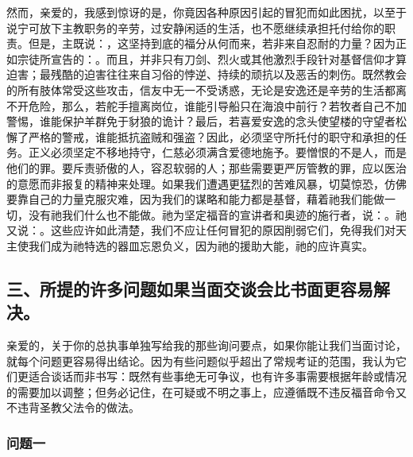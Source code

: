 然而，亲爱的，我感到惊讶的是，你竟因各种原因引起的冒犯而如此困扰，以至于说宁可放下主教职务的辛劳，过安静闲适的生活，也不愿继续承担托付给你的职责。但是，主既说：，这坚持到底的福分从何而来，若非来自忍耐的力量？因为正如宗徒所宣告的：。而且，并非只有刀剑、烈火或其他激烈手段针对基督信仰才算迫害；最残酷的迫害往往来自习俗的悖逆、持续的顽抗以及恶舌的刺伤。既然教会的所有肢体常受这些攻击，信友中无一不受诱惑，无论是安逸还是辛劳的生活都离不开危险，那么，若舵手擅离岗位，谁能引导船只在海浪中前行？若牧者自己不加警惕，谁能保护羊群免于豺狼的诡计？最后，若喜爱安逸的念头使望楼的守望者松懈了严格的警戒，谁能抵抗盗贼和强盗？因此，必须坚守所托付的职守和承担的任务。正义必须坚定不移地持守，仁慈必须满含爱德地施予。要憎恨的不是人，而是他们的罪。要斥责骄傲的人，容忍软弱的人；那些需要更严厉管教的罪，应以医治的意愿而非报复的精神来处理。如果我们遭遇更猛烈的苦难风暴，切莫惊恐，仿佛要靠自己的力量克服灾难，因为我们的谋略和能力都是基督，藉着祂我们能做一切，没有祂我们什么也不能做。祂为坚定福音的宣讲者和奥迹的施行者，说：。祂又说：。这些应许如此清楚，我们不应让任何冒犯的原因削弱它们，免得我们对天主使我们成为祂特选的器皿忘恩负义，因为祂的援助大能，祂的应许真实。\par


\subsection{三、所提的许多问题如果当面交谈会比书面更容易解决。}

亲爱的，关于你的总执事单独写给我的那些询问要点，如果你能让我们当面讨论，就每个问题更容易得出结论。因为有些问题似乎超出了常规考证的范围，我认为它们更适合谈话而非书写：既然有些事绝无可争议，也有许多事需要根据年龄或情况的需要加以调整；但务必记住，在可疑或不明之事上，应遵循既不违反福音命令又不违背圣教父法令的做法。\par


\subsubsection{问题一}

